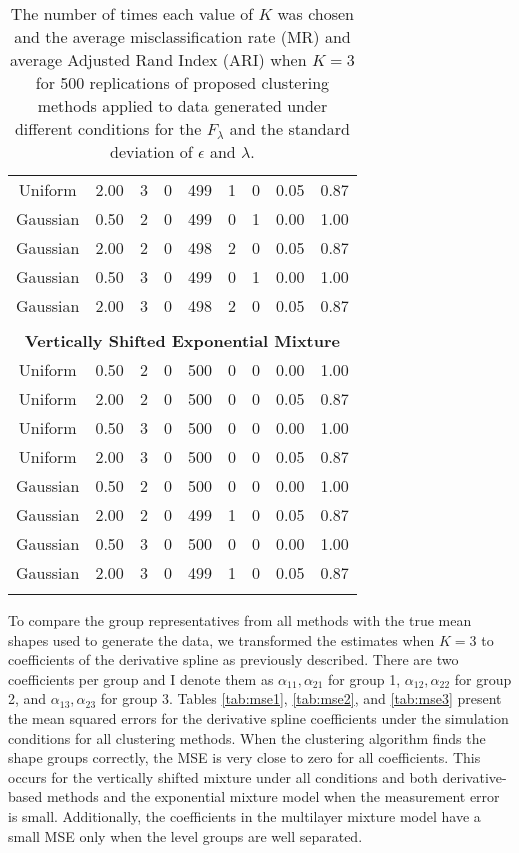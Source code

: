 \begin{table}[ht]
\begin{center}
\begin{tabular}{ccc|cccccc}
  Uniform & 2.00 &   3 & 0 & 499 & 1 & 0 & 0.05 & 0.87 \\ 
  Gaussian & 0.50 &   2 & 0 & 499 & 0 & 1 & 0.00 & 1.00 \\ 
  Gaussian & 2.00 &   2 & 0 & 498 & 2 & 0 & 0.05 & 0.87 \\ 
  Gaussian & 0.50 &   3 & 0 & 499 & 0 & 1 & 0.00 & 1.00 \\ 
  Gaussian & 2.00 &   3 & 0 & 498 & 2 & 0 & 0.05 & 0.87 \\ 
   \\ \multicolumn{9}{c}{\textbf{Vertically Shifted Exponential Mixture}}\\Uniform & 0.50 &   2 & 0 & 500 & 0 & 0 & 0.00 & 1.00 \\ 
  Uniform & 2.00 &   2 & 0 & 500 & 0 & 0 & 0.05 & 0.87 \\ 
  Uniform & 0.50 &   3 & 0 & 500 & 0 & 0 & 0.00 & 1.00 \\ 
  Uniform & 2.00 &   3 & 0 & 500 & 0 & 0 & 0.05 & 0.87 \\ 
  Gaussian & 0.50 &   2 & 0 & 500 & 0 & 0 & 0.00 & 1.00 \\ 
  Gaussian & 2.00 &   2 & 0 & 499 & 1 & 0 & 0.05 & 0.87 \\ 
  Gaussian & 0.50 &   3 & 0 & 500 & 0 & 0 & 0.00 & 1.00 \\ 
  Gaussian & 2.00 &   3 & 0 & 499 & 1 & 0 & 0.05 & 0.87 \\ 
   \thickhline\end{tabular}
\caption{The number of times each value of $K$ was chosen and the average misclassification rate (MR) and average Adjusted Rand Index (ARI) when $K=3$ for 500 replications of proposed clustering methods applied to data generated under different conditions for the $F_{\lambda}$ and the standard deviation of $\epsilon$ and $\lambda$.}
\label{tab:freq3}
\end{center}
\end{table}
To compare the group representatives from all methods with the true mean shapes used to generate the data, we transformed the estimates when $K=3$ to coefficients of the derivative spline as previously described. There are two coefficients per group and I denote them as $\alpha_{11},\alpha_{21}$ for group 1, $\alpha_{12},\alpha_{22}$ for group 2, and $\alpha_{13},\alpha_{23}$ for group 3. Tables \ref{tab:mse1}, \ref{tab:mse2}, and \ref{tab:mse3} present the mean squared errors for the derivative spline coefficients under the simulation conditions for all clustering methods. When the clustering algorithm finds the shape groups correctly, the MSE is very close to zero for all coefficients. This occurs for the vertically shifted mixture under all conditions and both derivative-based methods and the exponential mixture model when the measurement error is small. Additionally, the coefficients in the multilayer mixture model have a small MSE only when the level groups are well separated.

